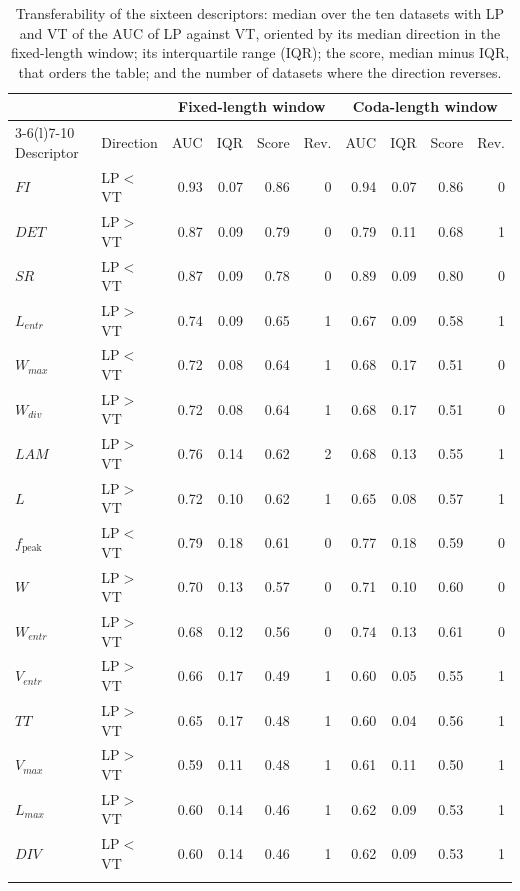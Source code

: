 \documentclass[pdflatex,sn-mathphys-num]{sn-jnl}
\begin{document}
\begin{appendices}
\begin{table}[h]
\caption{Transferability of the sixteen descriptors: median over the ten
datasets with LP and VT of the AUC of LP against VT, oriented by its median
direction in the fixed-length window; its interquartile range (IQR); the
score, median minus IQR, that orders the table; and the number of datasets
where the direction reverses.}
\label{tab:transferability}
\begin{tabular}{@{}llrrrrrrrr@{}}
\toprule
 & & \multicolumn{4}{c}{Fixed-length window} & \multicolumn{4}{c}{Coda-length window} \\
\cmidrule(lr){3-6}\cmidrule(l){7-10}
Descriptor & Direction & AUC & IQR & Score & Rev. & AUC & IQR & Score & Rev. \\
\midrule
$FI$ & LP$<$VT & 0.93 & 0.07 & 0.86 & 0 & 0.94 & 0.07 & 0.86 & 0 \\
$DET$ & LP$>$VT & 0.87 & 0.09 & 0.79 & 0 & 0.79 & 0.11 & 0.68 & 1 \\
$SR$ & LP$<$VT & 0.87 & 0.09 & 0.78 & 0 & 0.89 & 0.09 & 0.80 & 0 \\
$L_{entr}$ & LP$>$VT & 0.74 & 0.09 & 0.65 & 1 & 0.67 & 0.09 & 0.58 & 1 \\
$W_{max}$ & LP$<$VT & 0.72 & 0.08 & 0.64 & 1 & 0.68 & 0.17 & 0.51 & 0 \\
$W_{div}$ & LP$>$VT & 0.72 & 0.08 & 0.64 & 1 & 0.68 & 0.17 & 0.51 & 0 \\
$LAM$ & LP$>$VT & 0.76 & 0.14 & 0.62 & 2 & 0.68 & 0.13 & 0.55 & 1 \\
$L$ & LP$>$VT & 0.72 & 0.10 & 0.62 & 1 & 0.65 & 0.08 & 0.57 & 1 \\
$f_{\text{peak}}$ & LP$<$VT & 0.79 & 0.18 & 0.61 & 0 & 0.77 & 0.18 & 0.59 & 0 \\
$W$ & LP$>$VT & 0.70 & 0.13 & 0.57 & 0 & 0.71 & 0.10 & 0.60 & 0 \\
$W_{entr}$ & LP$>$VT & 0.68 & 0.12 & 0.56 & 0 & 0.74 & 0.13 & 0.61 & 0 \\
$V_{entr}$ & LP$>$VT & 0.66 & 0.17 & 0.49 & 1 & 0.60 & 0.05 & 0.55 & 1 \\
$TT$ & LP$>$VT & 0.65 & 0.17 & 0.48 & 1 & 0.60 & 0.04 & 0.56 & 1 \\
$V_{max}$ & LP$>$VT & 0.59 & 0.11 & 0.48 & 1 & 0.61 & 0.11 & 0.50 & 1 \\
$L_{max}$ & LP$>$VT & 0.60 & 0.14 & 0.46 & 1 & 0.62 & 0.09 & 0.53 & 1 \\
$DIV$ & LP$<$VT & 0.60 & 0.14 & 0.46 & 1 & 0.62 & 0.09 & 0.53 & 1 \\
\botrule
\end{tabular}
\end{table}


\end{appendices}
\end{document}
